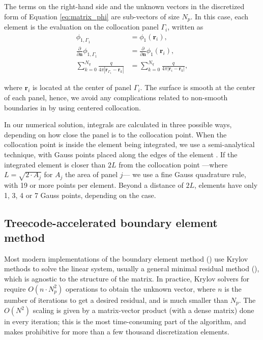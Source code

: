 The terms on the right-hand side and the unknown vectors in the discretized form of Equation \eqref{eq:matrix_phi} are sub-vectors of size $N_p$. In this case, each element is the evaluation on the collocation panel $\Gamma_i$, written as
%
\begin{align} \label{eq:vector_disc}
\phi_{1,\Gamma_1} &= \phi_1(\mathbf{r}_i), \nonumber \\
\frac{\partial}{\partial \mathbf{n}}\phi_{1,\Gamma_1} &= \frac{\partial}{\partial \mathbf{n}}\phi_1(\mathbf{r}_i), \nonumber \\
\sum_{k=0}^{N_q} \frac{q}{4\pi|\mathbf{r}_{\Gamma_1} - \mathbf{r}_k|} &= \sum_{k=0}^{N_q} \frac{q}{4\pi|\mathbf{r}_i - \mathbf{r}_k|},
\end{align}

\noindent where $\mathbf{r}_i$ is located at the center of panel $\Gamma_i$. The surface is smooth at the center of each panel, hence, we avoid any complications related to non-smooth boundaries in \bem by using centered collocation.


In our numerical solution, integrals are calculated in three possible ways, depending on how close the panel is to the collocation point. When the collocation point is inside the element being integrated, we use a semi-analytical technique, with Gauss points placed along the edges of the element \cite{HessSmith1967,ZhuHuangSongWhite2001}. If the integrated element is closer than $2L$ from the collocation point ---where $L = \sqrt{2\cdot A_j}$ for $A_j$ the area of panel $j$--- we use a fine Gauss quadrature rule, with 19 or more points per element. Beyond a distance of $2L$, elements have only 1, 3, 4 or 7 Gauss points, depending on the case.


\subsection{Treecode-accelerated boundary element method}

Most modern implementations of the boundary element method (\bem) use Krylov methods to solve the linear system, usually a general minimal residual method (\gmres), which is agnostic to the structure of the matrix. In practice, Krylov solvers for \bem require $O(n \cdot N_p^2)$ operations to obtain the unknown vector, where $n$ is the number of iterations to get a desired residual, and is much smaller than $N_p$. The $O(N^2)$ scaling is given by a matrix-vector product (with a dense matrix) done in every iteration; this is the most time-consuming part of the algorithm, and makes \bem prohibitive for more than a few thousand discretization elements. 

